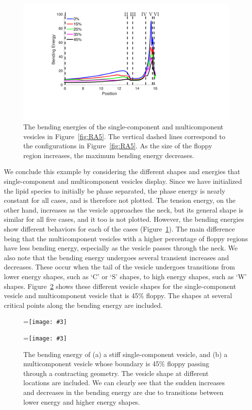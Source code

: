 \documentclass[twoside,twocolumn,9pt]{article}
\newcommand{\subfigimg}[3][,]{%
  \setbox1=\hbox{\texttt{[image: \#3]}}%
  \leavevmode\rlap{\usebox1}%
  \rlap{\hspace*{0pt}\raisebox{\dimexpr\ht1-0\baselineskip}{\bf
  \normalsize #2}}%
  \phantom{\usebox1}%
}
\begin{document}
\begin{figure}[h]
  \centering
  \includegraphics[width=\columnwidth]{figures/bendingContracting.pdf}
  \caption{\label{fig:bendingAll} \small The bending energies of the
  single-component and multicomponent vesicles in Figure~\ref{fig:RA5}.
  The vertical dashed lines correspond to the configurations in
  Figure~\ref{fig:RA5}. As the size of the floppy region increases, the
  maximum bending energy decreases.}
\end{figure}

We conclude this example by considering the different shapes and
energies that single-component and multicomponent vesicles display.
Since we have initialized the lipid species to initially be phase
separated, the phase energy is nearly constant for all cases, and is
therefore not plotted. The tension energy, on the other hand, increases
as the vesicle approaches the neck, but its general shape is similar for
all five cases, and it too is not plotted. However, the bending energies
show different behaviors for each of the cases
(Figure~\ref{fig:bendingAll}).  The main difference being that the
multicomponent vesicles with a higher percentage of floppy regions have
less bending energy, especially as the vesicle passes through the neck.
We also note that the bending energy undergoes several transient
increases and decreases. These occur when the tail of the vesicle
undergoes transitions from lower energy shapes, such as `C' or `S'
shapes, to high energy shapes, such as `W' shapes.
Figure~\ref{fig:bendingSC_contracting} shows these different vesicle
shapes for the single-component vesicle and multicomponent vesicle that
is 45\% floppy. The shapes at several critical points along the bending
energy are included.

\begin{figure}[h]
  \centering
  \subfigimg[width=\columnwidth]{(a)}{figures/ContractingEnergy_SC.pdf}
  \subfigimg[width=\columnwidth]{(b)}{figures/ContractingEnergy_MC.pdf}
  \caption{\label{fig:bendingSC_contracting} \small The bending energy
  of (a) a stiff single-component vesicle, and (b) a multicomponent
  vesicle whose boundary is 45\% floppy passing through a contracting
  geometry. The vesicle shape at different locations are included. We
  can clearly see that the sudden increases and decreases in the bending
  energy are due to transitions between lower energy and higher energy
  shapes.}
\end{figure}
\end{document}
